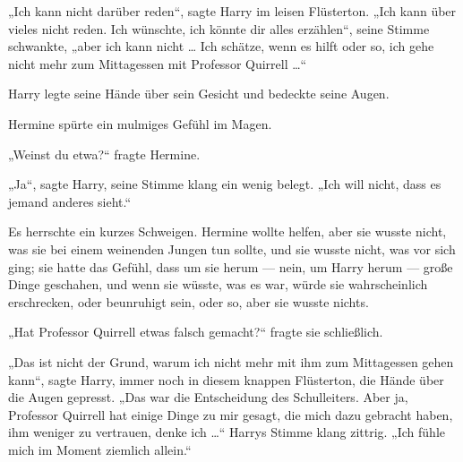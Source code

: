 „Ich kann nicht darüber reden“, sagte Harry im leisen Flüsterton.
„Ich kann über vieles nicht reden. Ich wünschte, ich könnte dir alles erzählen“, seine Stimme schwankte, „aber ich kann nicht … Ich schätze, wenn es hilft oder so, ich gehe nicht mehr zum Mittagessen mit Professor Quirrell …“

Harry legte seine Hände über sein Gesicht und bedeckte seine Augen.

Hermine spürte ein mulmiges Gefühl im Magen.

„Weinst du etwa?“ fragte Hermine.

„Ja“, sagte Harry, seine Stimme klang ein wenig belegt.
„Ich will nicht, dass es jemand anderes sieht.“

Es herrschte ein kurzes Schweigen. Hermine wollte helfen, aber sie wusste nicht, was sie bei einem weinenden Jungen tun sollte, und sie wusste nicht, was vor sich ging; sie hatte das Gefühl, dass um sie herum — nein, um Harry herum — große Dinge geschahen, und wenn sie wüsste, was es war, würde sie wahrscheinlich erschrecken, oder beunruhigt sein, oder so, aber sie wusste nichts.

„Hat Professor Quirrell etwas falsch gemacht?“ fragte sie schließlich.

„Das ist nicht der Grund, warum ich nicht mehr mit ihm zum Mittagessen gehen kann“, sagte Harry, immer noch in diesem knappen Flüsterton, die Hände über die Augen gepresst.
„Das war die Entscheidung des Schulleiters. Aber ja, Professor Quirrell hat einige Dinge zu mir gesagt, die mich dazu gebracht haben, ihm weniger zu vertrauen, denke ich …“ Harrys Stimme klang zittrig.
„Ich fühle mich im Moment ziemlich allein.“

